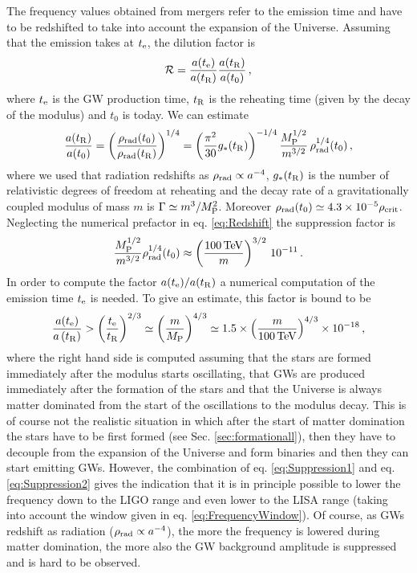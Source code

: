 \documentclass[11pt,a4paper]{article}
\begin{document}
The frequency values obtained from mergers refer to the emission time and have to be redshifted to take into account the expansion of the Universe. Assuming that the emission takes at $t_{\rm e}$, the dilution factor is
\begin{equation}
\mathcal{R} = \frac{a(t_{\rm e})}{a(t_{\rm R})} \frac{a(t_{\rm R})}{a(t_0)} \,,
\end{equation}
where $t_{\rm e}$ is the GW production time, $t_{\rm R}$ is the reheating time (given by the decay of the modulus) and $t_0$ is today. We can estimate
\begin{equation}
\label{eq:Redshift}
\frac{a(t_{\rm R})}{a(t_0)} = \left(\frac{\rho_{\rm rad}(t_0)}{\rho_{\rm rad}(t_{\rm R})}\right)^{1/4} = \left(\frac{\pi^2}{30} g_* (t_{\rm R})\right)^{-1/4} \frac{M_{\rm P}^{1/2}}{m^{3/2}} \, \rho_{\rm rad}^{1/4}(t_0) \,,
\end{equation}
where we used that radiation redshifts as $\rho_{\rm rad} \propto a^{-4}$, $g_* (t_{\rm R})$ is the number of relativistic degrees of freedom at reheating and the decay rate of a gravitationally coupled modulus of mass $m$ is $\Gamma \simeq m^3/M_{\rm P}^2$. Moreover $\rho_{\rm rad} (t_0) \simeq 4.3 \times 10^{-5} \rho_{\rm crit}$. Neglecting the numerical prefactor in eq. \eqref{eq:Redshift} the suppression factor is
\begin{equation}
\label{eq:Suppression1}
\frac{M_{\rm P}^{1/2}}{m^{3/2}} \rho_{\rm rad}^{1/4}(t_0) \approx \left(\frac{100 \, \text{TeV}}{m}\right)^{3/2} \, 10^{-11} \,.
\end{equation}
In order to compute the factor $a(t_{\rm e})/a(t_{\rm R})$ a numerical computation of the emission time $t_{\rm e}$ is needed. To give an estimate, this factor is bound to be
\begin{equation}
\label{eq:Suppression2}
\frac{a(t_{\rm e})}{a\left(t_{\rm R}\right)} > \left(\frac{t_{\rm e}}{t_{\rm R}} \right)^{2/3} \simeq \left(\frac{m}{M_{\rm P}}\right)^{4/3} \simeq  1.5 \times \left(\frac{m}{100 \, \text{TeV}}\right)^{4/3} \times 10^{-18} \,,
\end{equation}
where the right hand side is computed assuming that the stars are formed immediately after the modulus starts oscillating, that GWs are produced immediately after the formation of the stars and that the Universe is always matter dominated from the start of the oscillations to the modulus decay. This is of course not the realistic situation in which after the start of matter domination the stars have to be first formed (see Sec. \ref{sec:formationall}), then they have to decouple from the expansion of the Universe and form binaries and then they can start emitting GWs. However, the combination of eq. \eqref{eq:Suppression1} and eq. \eqref{eq:Suppression2} gives the indication that it is in principle possible to lower the frequency down to the LIGO range and even lower to the LISA range (taking into account the window given in eq. \eqref{eq:FrequencyWindow}). Of course, as GWs redshift as radiation ($\rho_{\rm rad} \propto a^{-4}$), the more the frequency is lowered during matter domination, the more also the GW background amplitude is suppressed and is hard to be observed.\\
\end{document}
